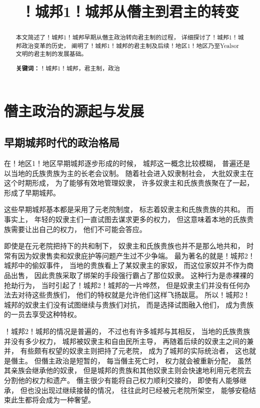 \documentclass[12pt, a4paper]{ctexart}
\title{！城邦1！城邦从僭主到君主的转变}
\author{}
\date{}
\begin{document}
\maketitle
\newpage
\begin{abstract}
    本文简述了！城邦1！城邦早期从僭主政治转向君主制的过程，
    详细探讨了！城邦1！城邦政治变革的历史，
    阐明了！城邦1！城邦的君主制及后续！地区1！地区乃至Yealsor文明的君主制的发展基础。
    \par\textbf{关键词：}！城邦1！城邦，君主制，政治
\end{abstract}

\section{僭主政治的源起与发展}
    \subsection{早期城邦时代的政治格局}
        在！地区1！地区早期城邦逐步形成的时候，
        城邦这一概念比较模糊，
        普遍还是以当地的氏族贵族为主的长老会议制。
        随着社会进入奴隶制社会，
        大批奴隶主在这个时期形成，
        为了能够有效地管理奴隶，
        许多奴隶主和氏族贵族聚在了一起，
        形成了早期城邦。

        这些早期城邦基本都是采用了元老院制度，
        标志着奴隶主和氏族贵族的共和。
        而事实上，
        年轻的奴隶主们一直试图去谋求更多的权力，
        但这意味着本地的氏族贵族需要让出自己的权力，
        他们不可能会答应。

        即使是在元老院把持下的共和制下，
        奴隶主和氏族贵族也并不是那么地共和，
        时常有因为奴隶售卖和奴隶庇护等问题产生过不少争端。
        最为著名的就是！城邦2！城邦中的偷奴事件，
        当地的贵族看上了某奴隶主的家奴，
        而这位家奴并不作为商品出售，
        因此贵族采取了绑架的手段强行霸占了那位奴隶。
        这种行为是赤裸裸的抢劫行为，
        当时引起了！城邦2！城邦的一片哗然，
        但是奴隶主们并没有任何办法去对待这些贵族们，
        他们的特权就是允许他们这样飞扬跋扈。
        所以！城邦2！城邦的奴隶主们没有试图继续与贵族们对抗，
        而是选择试图融入他们，
        成为贵族的一员去享受这种特权。

        ！城邦2！城邦的情况是普遍的，
        不过也有许多城邦与其相反，
        当地的氏族贵族并没有多少权力，
        城邦被奴隶主和自由民所主导，
        再随着后续的奴隶主之间的兼并，
        有些颇有权望的奴隶主则把持了元老院，
        成为了城邦的实际统治者，
        这也就是僭主。
        但僭主政治是短暂的，
        每当僭主死亡时，
        权力就会被重新分配，
        虽然其亲族会继承他的奴隶，
        但是城邦的贵族和其他奴隶主则会快速地利用元老院去分割他的权力和遗产。
        僭主很少有能将自己权力顺利交接的，
        即使有人能够继承，
        但也没出现过继续接替的情况，
        往往此时已经被元老院所架空，
        能够安稳结束此生都将会成为一种奢望。
\end{document}
